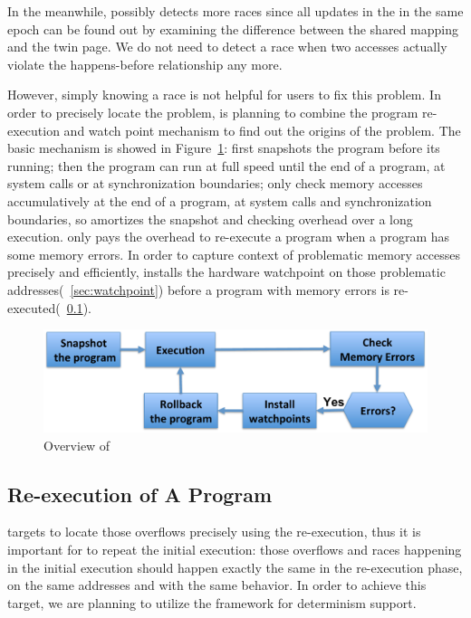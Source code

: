 In the meanwhile, \DoubleTake{} possibly detects more races since all updates in the 
in the same epoch can be found out by examining the difference between the shared 
mapping and the twin page.
We do not need to detect a race when two accesses actually violate the happens-before 
relationship any more.

However, simply knowing a race is not helpful for users to fix this problem. 
In order to precisely locate the problem, \DoubleTake{} is planning to combine the program
re-execution and watch point mechanism to find out the origins of the problem.
The basic mechanism is showed in Figure~\ref{fig:DoubleTakeoverview}: 
\DoubleTake{} first snapshots the program before its running; then the program can run at 
full speed until the end of a program, at system calls or at synchronization boundaries;
\DoubleTake{} only check memory accesses accumulatively at the end of a program, at system calls and 
synchronization boundaries,  so \DoubleTake{} amortizes
the snapshot and checking overhead over a long execution.
\DoubleTake{} only pays the overhead to re-execute a program when a program has some memory errors. 
In order to capture context of problematic memory accesses precisely and efficiently,
\DoubleTake{} installs the hardware watchpoint on those problematic addresses(~\ref{sec:watchpoint})
before a program with memory errors is re-executed(~\ref{sec:re-execute}).

\begin{figure}[!t]
{\centering
\includegraphics[width=5.4in]{fig/DoubleTakeoverview2}
\caption{Overview of \DoubleTake{}
\label{fig:DoubleTakeoverview}}
}
\end{figure}

\subsection{Re-execution of A Program}
\label{sec:re-execute}
\DoubleTake{} targets to locate those overflows precisely using the re-execution,
thus it is important for \DoubleTake{} to repeat the initial execution:
those overflows and races happening in the initial execution should happen exactly the same in
the re-execution phase, on the same addresses and with the same behavior.
In order to achieve this target, 
we are planning to utilize the \dthreads{} framework for determinism support.  

